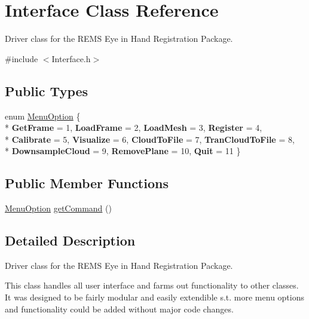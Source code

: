 \hypertarget{class_interface}{}\section{Interface Class Reference}
\label{class_interface}


Driver class for the R\+E\+MS Eye in Hand Registration Package.  




{\ttfamily \#include $<$Interface.\+h$>$}

\subsection*{Public Types}
\begin{DoxyCompactItemize}
\item 
enum \hyperlink{class_interface_a2dd5511ed0b74d5b99514602a30f32cd}{Menu\+Option} \{ \\*
{\bfseries Get\+Frame} = 1, 
{\bfseries Load\+Frame} = 2, 
{\bfseries Load\+Mesh} = 3, 
{\bfseries Register} = 4, 
\\*
{\bfseries Calibrate} = 5, 
{\bfseries Visualize} = 6, 
{\bfseries Cloud\+To\+File} = 7, 
{\bfseries Tran\+Cloud\+To\+File} = 8, 
\\*
{\bfseries Downsample\+Cloud} = 9, 
{\bfseries Remove\+Plane} = 10, 
{\bfseries Quit} = 11
 \}
\end{DoxyCompactItemize}
\subsection*{Public Member Functions}
\begin{DoxyCompactItemize}
\item 
\hyperlink{class_interface_a2dd5511ed0b74d5b99514602a30f32cd}{Menu\+Option} \hyperlink{class_interface_aec153e75a335f7dde55ebf5ac6d878f4}{get\+Command} ()
\end{DoxyCompactItemize}


\subsection{Detailed Description}
Driver class for the R\+E\+MS Eye in Hand Registration Package. 

This class handles all user interface and farms out functionality to other classes. It was designed to be fairly modular and easily extendible s.\+t. more menu options and functionality could be added without major code changes. 

